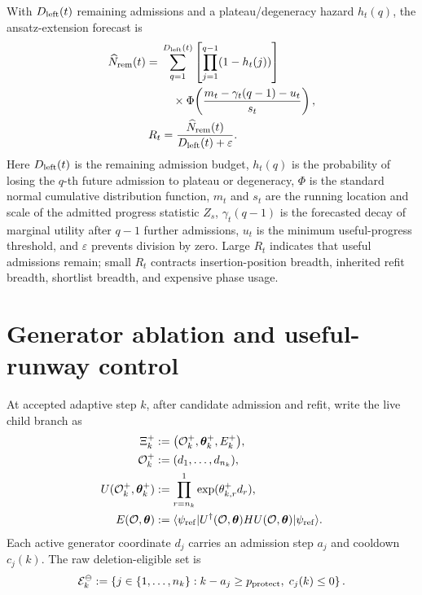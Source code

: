 \documentclass[
  reprint,
  amsmath,
  amssymb,
  aps,
  pra,
  nofootinbib,
  superscriptaddress,
  floatfix
]{revtex4-2}
\newcommand{\eps}{\varepsilon}
\begin{document}
With \(D_{\rm left}(t)\) remaining admissions and a plateau/degeneracy hazard \(h_t(q)\), the ansatz-extension forecast is
\begin{equation}
\begin{aligned}
\widehat N_{\rm rem}(t)
={}&
\sum_{q=1}^{D_{\rm left}(t)}
\left[\prod_{j=1}^{q-1}(1-h_t(j))\right]
\\
&\quad\times
\Phi\!\left(\frac{m_t-\gamma_t(q-1)-u_t}{s_t}\right),
\\
R_t&=\frac{\widehat N_{\rm rem}(t)}{D_{\rm left}(t)+\eps} .
\end{aligned}
\label{eq:expected_utility_left_archival}
\end{equation}
Here \(D_{\rm left}(t)\) is the remaining admission budget, \(h_t(q)\) is the probability of losing the \(q\)-th future admission to plateau or degeneracy, \(\Phi\) is the standard normal cumulative distribution function, \(m_t\) and \(s_t\) are the running location and scale of the admitted progress statistic \(Z_s\), \(\gamma_t(q-1)\) is the forecasted decay of marginal utility after \(q-1\) further admissions, \(u_t\) is the minimum useful-progress threshold, and \(\eps\) prevents division by zero. Large \(R_t\) indicates that useful admissions remain; small \(R_t\) contracts insertion-position breadth, inherited refit breadth, shortlist breadth, and expensive phase usage.


\section{Generator ablation and useful-runway control}
\label{app:generator_ablation_useful_runway_control}

At accepted adaptive step \(k\), after candidate admission and refit, write the live child branch as
\[
\begin{aligned}
\Xi_k^+
&:=
\bigl(\mathcal O_k^+,\boldsymbol\theta_k^+,E_k^+\bigr),
\\
\mathcal O_k^+
&:=(d_1,\ldots,d_{n_k}),
\\
U(\mathcal O_k^+,\boldsymbol\theta_k^+)
&:=
\prod_{r=n_k}^{1}
\exp(\theta_{k,r}^+d_r),
\\
E(\mathcal O,\boldsymbol\theta)
&:=
\langle\psi_{\rm ref}|
U^\dagger(\mathcal O,\boldsymbol\theta)H
U(\mathcal O,\boldsymbol\theta)
|\psi_{\rm ref}\rangle .
\end{aligned}
\]
Each active generator coordinate \(d_j\) carries an admission step \(a_j\) and cooldown \(c_j(k)\).  The raw deletion-eligible set is
\[
\mathcal E_k^\ominus
:=
\left\{
j\in\{1,\ldots,n_k\}:
k-a_j\ge p_{\rm protect},\;
c_j(k)\le 0
\right\}.
\]
\end{document}
